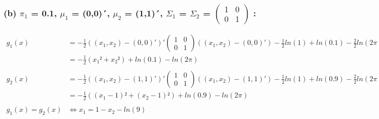 \documentclass[a4paper, 10pt]{article}
\begin{document}
\subsubsection*{(b) $\pi_{1}$ = 0.1, $\mu_{1}$ = (0,0)´, $\mu_{2}$ = (1,1)´, $\Sigma_{1}$ = $\Sigma_{2}$ =
$\begin{pmatrix} 1 & 0 \\ 0 & 1 \end{pmatrix}$ :}
\begin{align*}
g_{1}(x) &= -\frac{1}{2} ((x_{1}, x_{2}) - (0, 0)')' \begin{pmatrix} 1 & 0 \\ 0 & 1 \end{pmatrix} ((x_{1}, x_{2}) - (0, 0)') -
\frac{1}{2} ln(1) + ln(0.1) - \frac{2}{2} ln(2\pi)\\
	 &= -\frac{1}{2} (x_{1}² + x_{2}²) + ln(0.1) - ln(2 \pi)\\ \\
g_{2}(x) &= -\frac{1}{2} ((x_{1}, x_{2}) - (1, 1)')' \begin{pmatrix} 1 & 0 \\ 0 & 1 \end{pmatrix} ((x_{1}, x_{2}) - (1, 1)') -
\frac{1}{2} ln(1) + ln(0.9) - \frac{2}{2} ln(2\pi)\\
	 &= -\frac{1}{2} ((x_{1} - 1)² + (x_{2} - 1)²) + ln(0.9) - ln(2 \pi)\\ \\
g_{1}(x) = g_{2}(x) &\Leftrightarrow  x_{1} = 1 - x_{2} - ln(9)
\end{align*}\\
\end{document}
